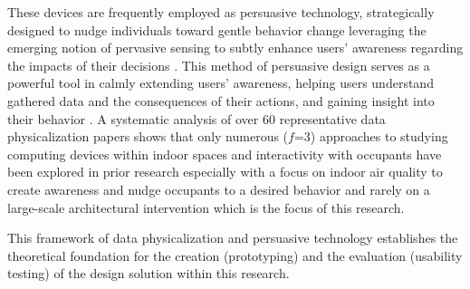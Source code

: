 These devices are frequently employed as persuasive technology, strategically designed to nudge individuals toward gentle
behavior change leveraging the emerging notion of pervasive sensing to subtly enhance users' awareness regarding the impacts of their decisions \cite{bader_windowwall_2019, rogers_ambient_2010}. This method of persuasive design serves as a powerful tool in calmly extending users' awareness, helping users understand gathered data and the consequences of their actions, and gaining insight into their behavior \cite{bae_making_2022}. A systematic analysis of over 60 representative data physicalization papers \cite{sauve_physecology_2022} shows that only numerous ($f$=3) approaches to studying computing devices within indoor spaces and interactivity with occupants have been explored in prior research especially with a focus on indoor air quality to create awareness and nudge occupants to a desired behavior and rarely on a large-scale architectural intervention which is the focus of this research.

This framework of data physicalization and persuasive technology establishes the theoretical foundation for the creation (prototyping) and the evaluation (usability testing) of the design solution within this research.